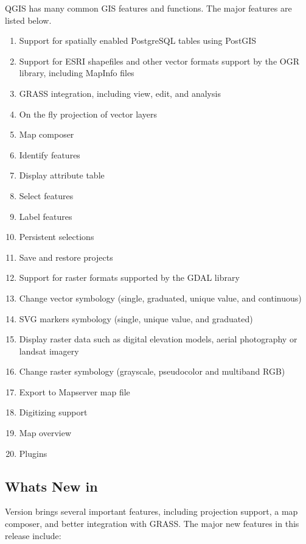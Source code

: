 QGIS has many common GIS features and functions. The major features
are listed below. 

\begin{enumerate}
\item Support for spatially enabled PostgreSQL tables using PostGIS 
\item Support for ESRI shapefiles and other vector formats support by the
OGR library, including MapInfo files 
\item GRASS integration, including view, edit, and analysis
\item On the fly projection of vector layers
\item Map composer
\item Identify features 
\item Display attribute table 
\item Select features 
\item Label features
\item Persistent selections 
\item Save and restore projects
\item Support for raster formats supported by the GDAL library 
\item Change vector symbology (single, graduated, unique value, and continuous) 
\item SVG markers symbology (single, unique value, and graduated) 
\item Display raster data such as digital elevation models, aerial photography
or landsat imagery 
\item Change raster symbology (grayscale, pseudocolor and multiband RGB) 
\item Export to Mapserver map file 
\item Digitizing support
\item Map overview
\item Plugins 
\end{enumerate}


\subsection{Whats New in \CURRENT}\label{label_whatsnew}

Version \CURRENT brings several important features, including projection
support, a map composer, and better integration with GRASS. The major new
features in this release include:

